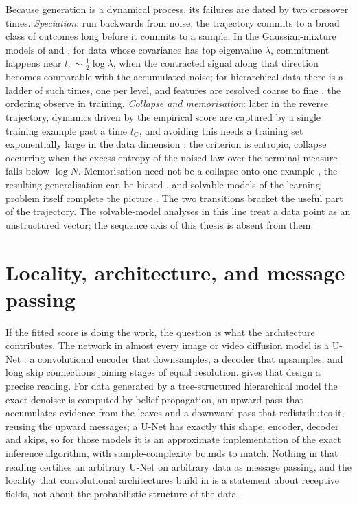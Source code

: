 Because generation is a dynamical process, its failures are dated by two
crossover times. \emph{Speciation}: run backwards from noise, the trajectory
commits to a broad class of outcomes long before it commits to a sample. In
the Gaussian-mixture models of \citet{biroli2024dynamical} and
\citet{achilli2026speciation}, for data whose covariance has top eigenvalue
$\lambda$, commitment happens near $t_{\mathrm S} \sim \tfrac12\log\lambda$,
when the contracted signal along that direction becomes comparable with the
accumulated noise; for hierarchical data there is a ladder of such times, one
per level, and features are resolved coarse to fine \citep{sclocchi2025phase,
sclocchi2025probing, favero2025compositional, favero2025bigger}, the ordering
\citet{bachtis2024cascade} observe in training. \emph{Collapse and
memorisation}: later in the reverse trajectory, dynamics driven by the
empirical score are captured by a single training example past a time
$t_{\mathrm C}$, and avoiding this needs a training set exponentially large in
the data dimension \citep{biroli2024dynamical, bonnaire2025memorize}; the
criterion is entropic, collapse occurring when the excess entropy of the
noised law over the terminal measure falls below $\log N$. Memorisation need
not be a collapse onto one example \citep{achilli2024losing}, the resulting
generalisation can be biased \citep{garnierbrun2026biased}, and solvable
models of the learning problem itself complete the picture
\citep{cui2025solvable}. The two transitions bracket the useful part of the
trajectory. The solvable-model analyses in this line treat a data point as an
unstructured vector; the sequence axis of this thesis is absent from them.

\section{Locality, architecture, and message passing}
\label{sec:sm-unet}

If the fitted score is doing the work, the question is what the architecture
contributes. The network in almost every image or video diffusion model is a
U-Net \citep{ronneberger2015unet}: a convolutional encoder that downsamples, a
decoder that upsamples, and long skip connections joining stages of equal
resolution. \citet{mei2024unets} gives that design a precise reading. For data
generated by a tree-structured hierarchical model the exact denoiser is
computed by belief propagation, an upward pass that accumulates evidence from
the leaves and a downward pass that redistributes it, reusing the upward
messages; a U-Net has exactly this shape, encoder, decoder and skips, so for
those models it is an approximate implementation of the exact inference
algorithm, with sample-complexity bounds to match. Nothing in that reading
certifies an arbitrary U-Net on arbitrary data as message passing, and the
locality that convolutional architectures build in \citep{lecun2015deep} is a
statement about receptive fields, not about the probabilistic structure of the
data.

